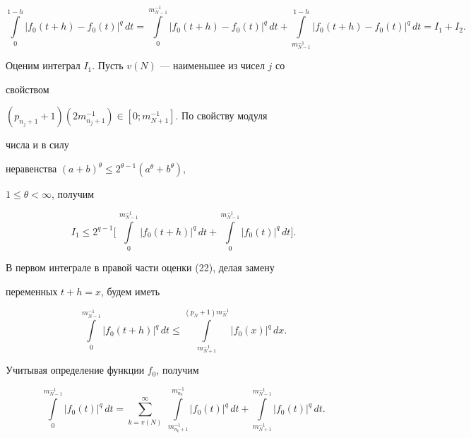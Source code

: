 \begin{pf}
\begin{equation} 


\int\limits^{1-h}_0|f_0(t+h)-f_0(t)|^q\,dt= 


\int\limits^{m^{-1}_{N-1}}_0|f_0(t+h)-f_0(t)|^q\,dt+ 


\int\limits^{1-h}_{m^{-1}_{N-1}}|f_0(t+h)-f_0(t)|^q\,dt=I_1+I_2. 


\end{equation} 


Оценим интеграл $I_1$. Пусть $v(N)$ --- наименьшее из чисел $j$ со 


свойством 


$(p_{n_j+1}+1)(2m^{-1}_{n_j+1})\in[0;m^{-1}_{N+1}]$. По свойству модуля 


числа и в силу 


неравенства $(a+b)^\theta\le2^{\theta-1}(a^\theta+b^\theta)$, 


$1\le\theta<\infty$, получим 


\begin{equation} 


I_1\le2^{q-1}\bigg[\,\int\limits^{m^{-1}_{N-1}}_0 


|f_0(t+h)|^q\,dt+\int\limits^{m^{-1}_{N-1}}_0


|f_0(t)|^q\,dt\bigg].


\end{equation} 


В первом интеграле в правой части оценки (22), делая замену 


переменных $t+h=x$, будем иметь 


\begin{equation} 


\int\limits^{m^{-1}_{N-1}}_0|f_0(t+h)|^q\,dt\le 


\int\limits^{(p_N+1)m^{-1}_N}_{m^{-1}_{N+1}}|f_0(x)|^q\,dx. 


\end{equation} 


Учитывая определение функции $f_0$, получим 


\begin{equation} 


\int\limits^{m^{-1}_{N-1}}_0|f_0(t)|^q\,dt= 


\sum^\infty_{k=v(N)}\;


\int\limits^{m^{-1}_{n_k}}_{m^{-1}_{n_k+1}}|f_0(t)|^q\,dt+ 


\int\limits^{m^{-1}_{N-1}}_{m^{-1}_{N+1}} 


|f_0(t)|^q\,dt. 



\end{equation}
\end{pf}
